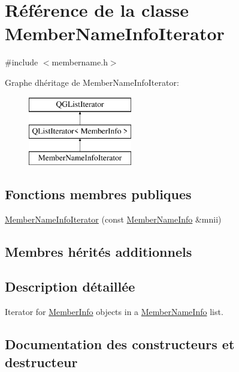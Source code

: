\hypertarget{class_member_name_info_iterator}{}\section{Référence de la classe Member\+Name\+Info\+Iterator}
\label{class_member_name_info_iterator}


{\ttfamily \#include $<$membername.\+h$>$}

Graphe d\textquotesingle{}héritage de Member\+Name\+Info\+Iterator\+:\begin{figure}[H]
\begin{center}
\leavevmode
\includegraphics[height=3.000000cm]{class_member_name_info_iterator}
\end{center}
\end{figure}
\subsection*{Fonctions membres publiques}
\begin{DoxyCompactItemize}
\item 
\hyperlink{class_member_name_info_iterator_a25e0896ffad9e6132b15d42887006205}{Member\+Name\+Info\+Iterator} (const \hyperlink{class_member_name_info}{Member\+Name\+Info} \&mnii)
\end{DoxyCompactItemize}
\subsection*{Membres hérités additionnels}


\subsection{Description détaillée}
Iterator for \hyperlink{struct_member_info}{Member\+Info} objects in a \hyperlink{class_member_name_info}{Member\+Name\+Info} list. 

\subsection{Documentation des constructeurs et destructeur}
\hypertarget{class_member_name_info_iterator_a25e0896ffad9e6132b15d42887006205}{}
